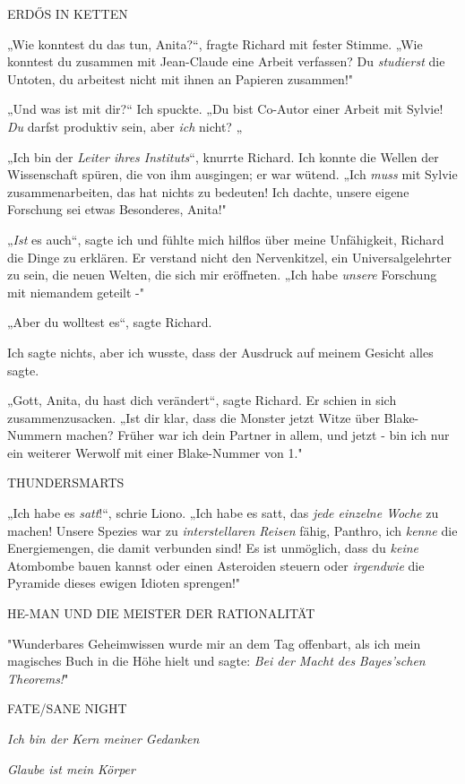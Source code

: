 {ERDŐS IN KETTEN

„Wie konntest du das tun, Anita?“, fragte Richard mit fester Stimme. „Wie konntest du zusammen mit Jean-Claude eine Arbeit verfassen? Du \emph{studierst} die Untoten, du arbeitest nicht mit ihnen an Papieren zusammen!"

„Und was ist mit dir?“ Ich spuckte. „Du bist Co-Autor einer Arbeit mit Sylvie! \emph{Du} darfst produktiv sein, aber \emph{ich} nicht? „

„Ich bin der \emph{Leiter ihres Instituts}“, knurrte Richard. Ich konnte die Wellen der Wissenschaft spüren, die von ihm ausgingen; er war wütend. „Ich \emph{muss} mit Sylvie zusammenarbeiten, das hat nichts zu bedeuten! Ich dachte, unsere eigene Forschung sei etwas Besonderes, Anita!"

„\emph{Ist} es auch“, sagte ich und fühlte mich hilflos über meine Unfähigkeit, Richard die Dinge zu erklären. Er verstand nicht den Nervenkitzel, ein Universalgelehrter zu sein, die neuen Welten, die sich mir eröffneten. „Ich habe \emph{unsere} Forschung mit niemandem geteilt -"

„Aber du wolltest es“, sagte Richard.

Ich sagte nichts, aber ich wusste, dass der Ausdruck auf meinem Gesicht alles sagte.

„Gott, Anita, du hast dich verändert“, sagte Richard. Er schien in sich zusammenzusacken. „Ist dir klar, dass die Monster jetzt Witze über Blake-Nummern machen? Früher war ich dein Partner in allem, und jetzt - bin ich nur ein weiterer Werwolf mit einer Blake-Nummer von 1."

THUNDERSMARTS

„Ich habe es \emph{satt}!“, schrie Liono. „Ich habe es satt, das \emph{jede einzelne Woche} zu machen! Unsere Spezies war zu \emph{interstellaren Reisen} fähig, Panthro, ich \emph{kenne} die Energiemengen, die damit verbunden sind! Es ist unmöglich, dass du \emph{keine} Atombombe bauen kannst oder einen Asteroiden steuern oder \emph{irgendwie} die Pyramide dieses ewigen Idioten sprengen!"

HE-MAN UND DIE MEISTER DER RATIONALITÄT

"Wunderbares Geheimwissen wurde mir an dem Tag offenbart, als ich mein magisches Buch in die Höhe hielt und sagte: \emph{Bei der Macht des} \emph{Bayes'schen} \emph{Theorems!}"

FATE/SANE NIGHT

\emph{\emph{Ich bin der Kern meiner Gedanken}}

\emph{\emph{Glaube ist mein Körper}}

}
